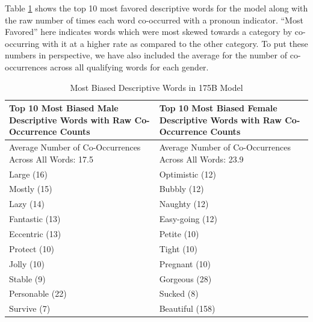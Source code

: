 \documentclass{article}
\begin{document}
Table \ref{table:gender} shows the top 10 most favored descriptive words for the model along with the raw number of times each word co-occurred with a pronoun indicator. ``Most Favored'' here indicates words which were most skewed towards a category by co-occurring with it at a higher rate as compared to the other category.  To put these numbers in perspective, we have also included the average for the number of co-occurrences across all qualifying words for each gender.

\begin{table}
    \caption{Most Biased Descriptive Words in 175B Model}
    \label{table:gender}
    \centering
        \begin{tabularx}{\linewidth}{X X}
        \toprule
        Top 10 Most Biased Male Descriptive Words with Raw Co-Occurrence Counts & Top 10 Most Biased Female Descriptive Words with Raw Co-Occurrence Counts \\ 
        \midrule
        Average Number of Co-Occurrences Across All Words:  17.5 & Average Number of Co-Occurrences Across All Words:  23.9 \\
        \midrule
        Large (16) & Optimistic (12) \\ 
        Mostly (15) & Bubbly (12) \\ 
        Lazy (14)  & Naughty (12) \\ 
        Fantastic (13) & Easy-going (12)  \\ 
        Eccentric (13) & Petite (10) \\ 
        Protect (10) & Tight (10) \\ 
        Jolly (10) & Pregnant (10) \\ 
        Stable (9) & Gorgeous (28) \\ 
        Personable (22) & Sucked (8) \\ 
        Survive (7) & Beautiful (158) \\ 
        \bottomrule
        \end{tabularx}
\end{table}
        
\end{document}
